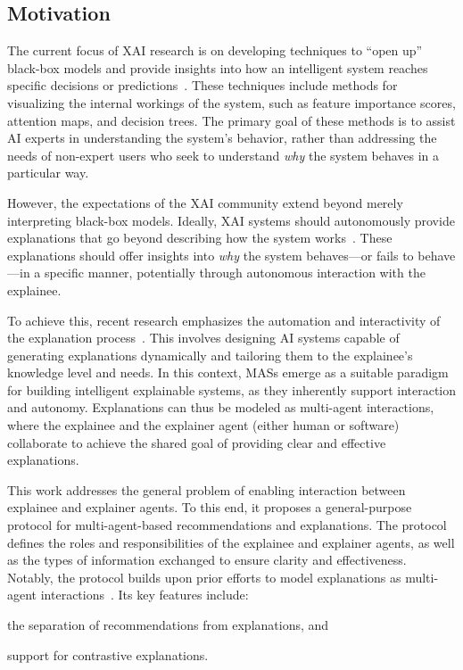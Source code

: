 \subsection{Motivation}\label{subsec:introduction-general-purpose-protocol-for-multi-agent-based-explanations}
%
The current focus of \gls{XAI} research is on developing techniques to ``open up'' black-box models and provide insights into how an intelligent system reaches specific decisions or predictions~\cite{citation_needed}.
%
These techniques include methods for visualizing the internal workings of the system, such as feature importance scores, attention maps, and decision trees.
%
The primary goal of these methods is to assist \gls{AI} experts in understanding the system's behavior, rather than addressing the needs of non-expert users who seek to understand \emph{why} the system behaves in a particular way.

However, the expectations of the \gls{XAI} community extend beyond merely interpreting black-box models.
%
Ideally, \gls{XAI} systems should autonomously provide explanations that go beyond describing how the system works~\cite{citation_needed}.
%
These explanations should offer insights into \emph{why} the system behaves—or fails to behave—in a specific manner, potentially through autonomous interaction with the explainee.

To achieve this, recent research emphasizes the automation and interactivity of the explanation process~\cite{citation_needed}.
%
This involves designing \gls{AI} systems capable of generating explanations dynamically and tailoring them to the explainee's knowledge level and needs.
%
In this context, \glspl{MAS} emerge as a suitable paradigm for building intelligent explainable systems, as they inherently support interaction and autonomy.
%
Explanations can thus be modeled as multi-agent interactions, where the explainee and the explainer agent (either human or software) collaborate to achieve the shared goal of providing clear and effective explanations.

This work addresses the general problem of enabling interaction between explainee and explainer agents.
%
To this end, it proposes a general-purpose protocol for multi-agent-based recommendations and explanations.
%
The protocol defines the roles and responsibilities of the explainee and explainer agents, as well as the types of information exchanged to ensure clarity and effectiveness.
%
Notably, the protocol builds upon prior efforts to model explanations as multi-agent interactions~\cite{citation_needed}.
%
Its key features include:
%
\begin{inlinelist}
    \item the separation of recommendations from explanations, and
    \item support for contrastive explanations.
\end{inlinelist}

